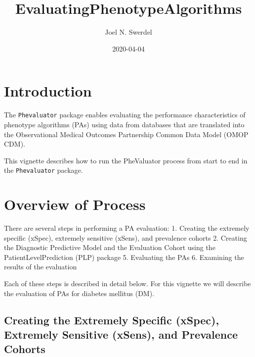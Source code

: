 \documentclass[
]{article}
\title{EvaluatingPhenotypeAlgorithms}
\author{Joel N. Swerdel}
\date{2020-04-04}
\begin{document}
\maketitle

{
\setcounter{tocdepth}{3}
\tableofcontents
}
\newpage

\hypertarget{introduction}{%
\section{Introduction}\label{introduction}}

The \texttt{Phevaluator} package enables evaluating the performance
characteristics of phenotype algorithms (PAs) using data from databases
that are translated into the Observational Medical Outcomes Partnership
Common Data Model (OMOP CDM).

This vignette describes how to run the PheValuator process from start to
end in the \texttt{Phevaluator} package.

\hypertarget{overview-of-process}{%
\section{Overview of Process}\label{overview-of-process}}

There are several steps in performing a PA evaluation: 1. Creating the
extremely specific (xSpec), extremely sensitive (xSens), and prevalence
cohorts 2. Creating the Diagnostic Predictive Model and the Evaluation
Cohort using the PatientLevelPrediction (PLP) package 5. Evaluating the
PAs 6. Examining the results of the evaluation

Each of these steps is described in detail below. For this vignette we
will describe the evaluation of PAs for diabetes mellitus (DM).

\hypertarget{creating-the-extremely-specific-xspec-extremely-sensitive-xsens-and-prevalence-cohorts}{%
\subsection{Creating the Extremely Specific (xSpec), Extremely Sensitive
(xSens), and Prevalence
Cohorts}\label{creating-the-extremely-specific-xspec-extremely-sensitive-xsens-and-prevalence-cohorts}}
\end{document}
